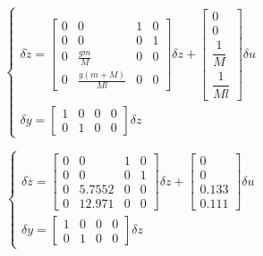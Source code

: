 \documentclass[12pt,letterpaper]{article}
\begin{document}
\begin{equation*}
    \begin{cases}
        \delta \dot z =     
        \begin{bmatrix}
            0 & 0                   & 1 & 0\\ 
            0 & 0                   & 0 & 1\\ 
            0 & \frac{gm}{M}        & 0 & 0\\[10pt] 
            0 & \frac{g(m+M)}{Ml}   & 0 & 0
        \end{bmatrix}
        \delta z
        +
        \begin{bmatrix}
            0\\ 
            0\\ 
            \dfrac{1}{M}\\[10pt] 
            \dfrac{1}{Ml}
        \end{bmatrix}
        \delta u \\
        \delta y = 
            \begin{bmatrix}
            1 & 0 & 0 & 0 \\
            0 & 1 & 0 & 0
            \end{bmatrix}
            \delta z
    \end{cases}
\end{equation*}

\begin{equation*}
    \begin{cases}
        \delta \dot z =     
        \begin{bmatrix}
            0 & 0                   & 1 & 0\\ 
            0 & 0                   & 0 & 1\\ 
            0 & 5.7552              & 0 & 0\\
            0 & 12.971              & 0 & 0
        \end{bmatrix}
        \delta z
        +
        \begin{bmatrix}
            0\\ 
            0\\ 
            0.133\\
            0.111
        \end{bmatrix}
        \delta u \\
        \delta y = 
            \begin{bmatrix}
            1 & 0 & 0 & 0 \\
            0 & 1 & 0 & 0
            \end{bmatrix}
            \delta z
    \end{cases}
\end{equation*}
\end{document}
